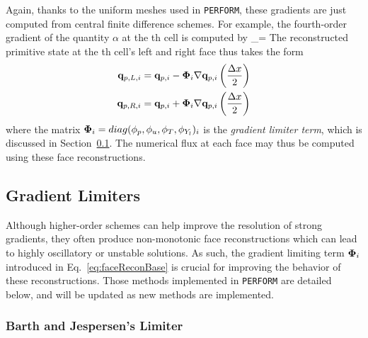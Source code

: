 Again, thanks to the uniform meshes used in \verb|PERFORM|, these gradients are just computed from central finite difference schemes. For example, the fourth-order gradient of the quantity $\alpha$ at the \coordIdx th cell is computed by
\be\label{eq:faceReconBase}
    \nabla \alpha_\coordIdx = 
\ee
The reconstructed primitive state at the \coordIdx th cell's left and right face thus takes the form
\begin{align}
    \mathbf{q}_{p, L, i} &= \mathbf{q}_{p, i} - \mathbf{\Phi}_{i} \nabla \mathbf{q}_{p, i} \left( \frac{\Delta x}{2} \right) \\
    \mathbf{q}_{p, R, i} &= \mathbf{q}_{p, i} + \mathbf{\Phi}_{i} \nabla \mathbf{q}_{p, i} \left( \frac{\Delta x}{2} \right)
\end{align}
where the matrix $\mathbf{\Phi}_{i} = diag(\phi_p, \phi_u, \phi_T, \phi_{Y_{l}})_{i}$ is the \textit{gradient limiter term}, which is discussed in Section~\ref{sec:gradLimiters}. The numerical flux at each face may thus be computed using these face reconstructions.

\newpage
\subsection{Gradient Limiters}\label{sec:gradLimiters}

Although higher-order schemes can help improve the resolution of strong gradients, they often produce non-monotonic face reconstructions which can lead to highly oscillatory or unstable solutions. As such, the gradient limiting term $\mathbf{\Phi}_{i}$ introduced in Eq.~\ref{eq:faceReconBase} is crucial for improving the behavior of these reconstructions. Those methods implemented in \verb|PERFORM| are detailed below, and will be updated as new methods are implemented.

\subsubsection{Barth and Jespersen's Limiter}

